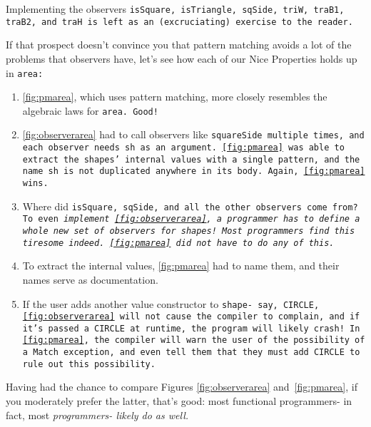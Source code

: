 \documentclass[manuscript,screen,review, 12pt, nonacm]{acmart}
\begin{document}
\begin{outline}[enumerate]
    Implementing the observers \tt{isSquare}, \tt{isTriangle}, \tt{sqSide},
    \tt{triW}, \tt{traB1}, \tt{traB2}, and \tt{traH} is left as an
    (excruciating) exercise to the reader. 
    
    If that prospect doesn't convince you that pattern matching avoids a lot of
    the problems that observers have, let's see how each of our Nice Properties
    holds up in \tt{area}: 
    
    \begin{enumerate}
        \item \ref{fig:pmarea}, which uses pattern matching, more closely
        resembles the algebraic laws for \tt{area}. Good! 
        \item \ref{fig:observerarea} had to call observers like \tt{squareSide}
        multiple times, and each observer needs \tt{sh} as an argument.
        \ref{fig:pmarea} was able to extract the \tt{shape}s' internal values
        with a single pattern, and the name \tt{sh} is not duplicated anywhere
        in its body. Again, \ref{fig:pmarea} wins. 
        \item Where did \tt{isSquare}, \tt{sqSide}, and all the other observers
        come from? To even \it{implement} \ref{fig:observerarea}, a programmer
        has to define a whole new set of observers for \tt{shape}s! Most
        programmers find this tiresome indeed. \ref{fig:pmarea} did not have to
        do any of this. 
        \item To extract the internal values, \ref{fig:pmarea} had to name them,
        and their names serve as documentation. 
        \item If the user adds another value constructor to \tt{shape}- say,
        \tt{CIRCLE}, \ref{fig:observerarea} will not cause the compiler to
        complain, and if it's passed a \tt{CIRCLE} at runtime, the program will
        likely crash! In \ref{fig:pmarea}, the compiler will warn the user of
        the possibility of a \tt{Match} exception, and even tell them that they
        must add \tt{CIRCLE} to rule out this possibility. 
    \end{enumerate}

    Having had the chance to compare Figures \ref{fig:observerarea}
    and~\ref{fig:pmarea}, if you moderately prefer the latter, that's good: most
    functional programmers- in fact, most \it{programmers}- likely do as well. 


\end{outline}
\end{document}
